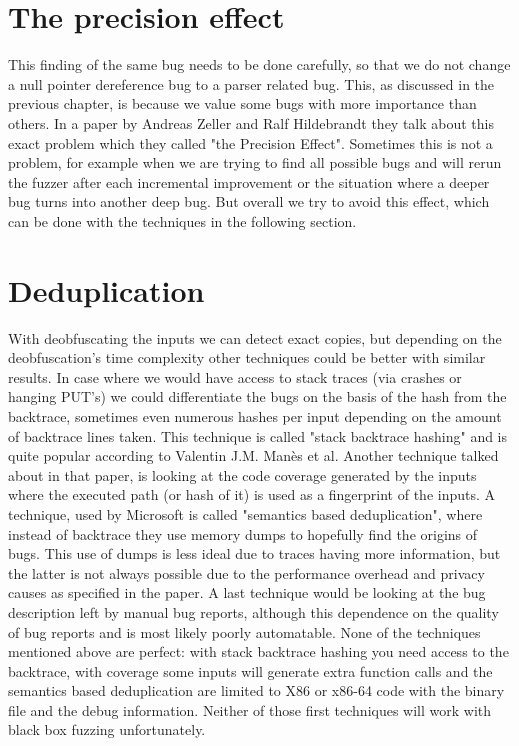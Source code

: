 \section{The precision effect}
\label{cha:3:PersisionEffect}
This finding of the same bug needs to be done carefully, so that we do not change a null pointer dereference bug to a parser related bug. This, as discussed in the previous chapter, is because we value some bugs with more importance than others. 
In a paper by Andreas Zeller and Ralf Hildebrandt\cite{5zeller2002simplifyingIsolatingFailure-inducing} they talk about this exact problem which they called "the Precision Effect". Sometimes this is not a problem, for example when we are trying to find all possible bugs and will rerun the fuzzer after each incremental improvement or the situation where a deeper bug turns into another deep bug. But overall we try to avoid this effect, which can be done with the techniques in the following section.

\section{Deduplication}
\label{cha:3:Deduplication}
With deobfuscating the inputs we can detect exact copies, but depending on the deobfuscation's time complexity other techniques could be better with similar results. In case where we would have access to stack traces (via crashes or hanging PUT's) we could differentiate the bugs on the basis of the hash from the backtrace, sometimes even numerous hashes per input depending on the amount of backtrace lines taken. This technique is called "stack backtrace hashing" and is quite popular according to Valentin J.M. Man\`es et al.\cite{13manes2019survey} 
Another technique talked about in that paper, is looking at the code coverage generated by the inputs where the executed path (or hash of it) is used as a fingerprint of the inputs. A technique, used by Microsoft\cite{36semanticsAwareDeduplicationRETracer} is called "semantics based deduplication", where instead of backtrace they use memory dumps to hopefully find the origins of bugs. This use of dumps is less ideal due to traces having more information, but the latter is not always possible due to the performance overhead and privacy causes as specified in the paper. 
A last technique would be looking at the bug description left by manual bug reports, although this dependence on the quality of bug reports and is most likely poorly automatable. 
None of the techniques mentioned above are perfect: with stack backtrace hashing you need access to the backtrace, with coverage some inputs will generate extra function calls and the semantics based deduplication are limited to X86 or x86-64 code with the binary file and the debug information. Neither of those first techniques will work with black box fuzzing unfortunately.

